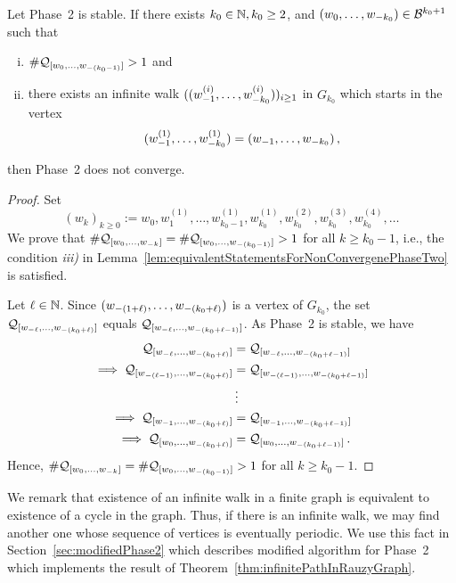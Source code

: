 \begin{thm}
\label{thm:infinitePathInRauzyGraph}
Let Phase~2 is stable.  If there exists $k_0\in\NN, k_0\geq 2$, and $\tupleo{k_0}\in\B^{k_0+1}$ such that
\begin{enumerate}[i)]
	\item $\#\Qwo{(k_0-1)}>1$ and
	\item there exists an infinite walk $(\tuple[w^{(i)}]{1}{k_0})_{i\geq 1}$ in $G_{k_0}$ which starts in the vertex  $$\tuple[w^{(1)}]{1}{k_0}=\tuple{1}{k_0}\,,$$ 
\end{enumerate}
then Phase~2 does not converge.
\end{thm}
\begin{proof}
Set
$$(w_k)_{k\geq 0}:=w_0, w_1^{(1)}, \dots , w^{(1)}_{k_0-1}, w^{(1)}_{k_0}, w_{k_0}^{(2)},w_{k_0}^{(3)},w_{k_0}^{(4)},\dots$$
We prove that $\#\Qwo{k}=\#\Qwo{(k_0-1)}>1$ for all $k\geq k_0-1$, i.e., the condition \textit{iii)} in Lemma~\ref{lem:equivalentStatementsForNonConvergenePhaseTwo} is satisfied.


Let $\ell\in\NN$. Since $\tuple{(1+\ell)}{(k_0+\ell)}$ is a vertex of $G_{k_0}$, the set $\Qw{\ell}{(k_0+\ell)}$ equals $\Qw{\ell}{(k_0+\ell-1)}$. As Phase~2 is stable, we have
\begin{align*}
\Qw{\ell}{(k_0+\ell)}&=\Qw{\ell}{(k_0+\ell-1)}\\
\implies \Qw{(\ell-1)}{(k_0+\ell)}&=\Qw{(\ell-1)}{(k_0+\ell-1)}\\
&\vdots \\
\implies \Qw{1}{(k_0+\ell)}&=\Qw{1}{(k_0+\ell-1)}\\
\implies \Qwo{(k_0+\ell)}&=\Qwo{(k_0+\ell-1)}\,.
\end{align*}
Hence, $\#\Qwo{k}=\#\Qwo{(k_0-1)}>1$ for all $k\geq k_0-1$.
\end{proof}



We remark that existence of an infinite walk in a finite graph is equivalent to existence of a cycle in the graph. Thus, if there is an infinite walk, we may find another one whose sequence of vertices is eventually periodic. We use this fact in Section~\ref{sec:modifiedPhase2} which describes modified algorithm for Phase~2 which implements the result of Theorem~\ref{thm:infinitePathInRauzyGraph}.









